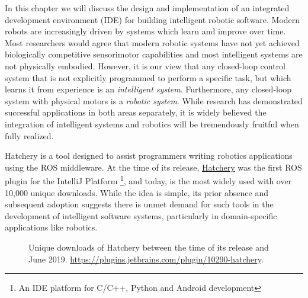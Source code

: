 \documentclass[12pt,initial,twoside,maitrise]{dms}
\numberwithin{equation}{section}
\numberwithin{table}{chapter}
\numberwithin{figure}{chapter}
\begin{document}
In this chapter we will discuss the design and implementation of an integrated development environment (IDE) for building intelligent robotic software. Modern robots are increasingly driven by systems which learn and improve over time. Most researchers would agree that modern robotic systems have not yet achieved biologically competitive sensorimotor capabilities and most intelligent systems are not physically embodied. However, it is our view that any closed-loop control system that is not explicitly programmed to perform a specific task, but which learns it from experience is an \textit{intelligent system}. Furthermore, any closed-loop system with physical motors is a \textit{robotic system}. While research has demonstrated successful applications in both areas separately, it is widely believed the integration of intelligent systems and robotics will be tremendously fruitful when fully realized.

Hatchery is a tool designed to assist programmers writing robotics applications using the ROS middleware. At the time of its release, \href{https://github.com/duckietown/hatchery}{Hatchery} was the first ROS plugin for the IntelliJ Platform \footnote{An IDE platform for C/C++, Python and Android development}, and today, is the most widely used with over 10,000 unique downloads. While the idea is simple, its prior absence and subsequent adoption suggests there is unmet demand for such tools in the development of intelligent software systems, particularly in domain-specific applications like robotics.
%

\begin{figure}
\centering
{}
\caption{Unique downloads of Hatchery between the time of its release and June 2019. \url{https://plugins.jetbrains.com/plugin/10290-hatchery}.}
\label{fig:hatchery_downloads}
\end{figure}
%
\end{document}
